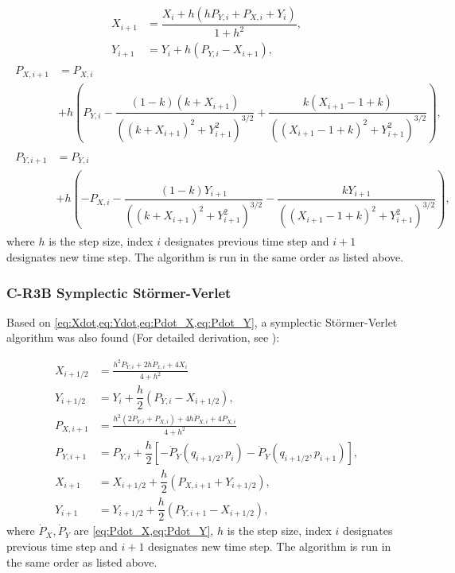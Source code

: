 \begin{align}
    X_{i+1} &= \dfrac{X_i + h (h P_{Y,i} + P_{X,i} + Y_i)}{1+h^2}, \\[0.4cm]
    Y_{i+1} &= Y_i + h (P_{Y,i} - X_{i+1}), \label{eq:symplectic-euler-Y_i+1}
\end{align}
\begin{align}
    \begin{aligned}
        P_{X,i+1} &= P_{X,i} \\
        &+ h \left(P_{Y,i} - \dfrac{(1-k)(k+X_{i+1})}{((k+X_{i+1})^2+Y_{i+1}^2)^{3/2}} + \dfrac{k(X_{i+1}-1+k)}{((X_{i+1}-1+k)^2+Y_{i+1}^2)^{3/2}}\right), \label{eq:symplectic-euler-PX_i+1}
    \end{aligned} \\[0.4cm]
    \begin{aligned}
        P_{Y,i+1} &= P_{Y,i} \\
        &+ h \left(-P_{X,i} - \dfrac{(1-k)Y_{i+1}}{((k+X_{i+1})^2+Y_{i+1}^2)^{3/2}} - \dfrac{k Y_{i+1}}{((X_{i+1}-1+k)^2+Y_{i+1}^2)^{3/2}}\right), \label{eq:symplectic-euler-PY_i+1}
    \end{aligned}
\end{align}
where \(h\) is the step size, index \(i\) designates previous time step and \(i+1\) designates new time step. The algorithm is run in the same order as listed above.

\subsubsection{C-R3B Symplectic Störmer-Verlet}
Based on \cref{eq:Xdot,eq:Ydot,eq:Pdot_X,eq:Pdot_Y}, a symplectic Störmer-Verlet algorithm was also found (For detailed derivation, see \cite{Saxe2015}):

\begin{align}
    X_{i+1/2} &= \frac{h^2 P_{Y,i} + 2 h \dot{P}_{x,i} + 4 X_i}{4 + h^2} \label{eq:verlet-x_1/2} \\
    Y_{i+1/2} &= Y_i + \dfrac{h}{2} (P_{Y,i} - X_{i+1/2}), \label{eq:verlet-y_1/2} \\
    P_{X,i+1} &= \frac{h^2 (2 \dot{P}_{Y,i} + P_{X,i}) + 4 h \dot{P}_{X,i} + 4 P_{X,i} }{4 + h^2} \label{eq:verlet-px_1} \\
    P_{Y,i+1} &= P_{Y,i} + \dfrac{h}{2} \left[-\dot{P}_Y(q_{i+1/2},p_i) -\dot{P}_Y(q_{i+1/2},p_{i+1}) \right], \label{eq:verlet-py_1} \\
    X_{i+1} &= X_{i+1/2} + \dfrac{h}{2} (P_{X,i+1} + Y_{i+1/2}), \label{eq:verlet-x_1} \\
    Y_{i+1} &= Y_{i+1/2} + \dfrac{h}{2} (P_{Y,i+1} - X_{i+1/2}), \label{eq:verlet-y_1}
\end{align}
where \(\dot{P}_X,\dot{P}_Y\) are \cref{eq:Pdot_X,eq:Pdot_Y}, \(h\) is the step size, index \(i\) designates previous time step and \(i+1\) designates new time step. The algorithm is run in the same order as listed above.

